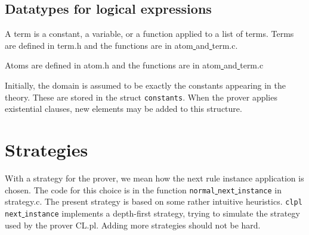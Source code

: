 \documentclass[a4paper]{article}
\begin{document}
\subsection{Datatypes for logical expressions}
A term is a constant, a variable, or a function applied to a list of terms. Terms are defined in term.h and the functions are in atom\underline{ }and\underline{ }term.c. 

Atoms are defined in atom.h and the functions are in atom\underline{ }and\underline{ }term.c

Initially, the domain is assumed to be exactly the constants appearing in the theory. These are stored in the struct \verb|constants|. When the prover applies existential clauses, new elements may be added to this structure. 

\section{Strategies}
With a strategy for the prover, we mean how the next rule instance application is chosen. The code for this choice is in the function \verb|normal|\underline{ }\verb|next|\underline{ }\verb|instance| in strategy.c. The present strategy is based on some rather intuitive heuristics. \verb|clpl|\underline{ }\verb|next|\underline{ }\verb|instance| implements a depth-first strategy, trying to simulate the strategy used by the prover CL.pl. Adding more strategies should not be hard.
\end{document}
